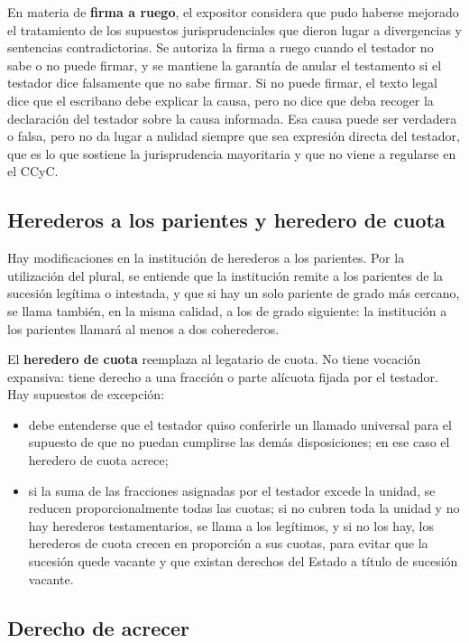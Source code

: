 \documentclass[12pt,oneside]{book}
\begin{document}
En materia de \textbf{firma a ruego}, el expositor considera que pudo haberse mejorado el tratamiento de los supuestos jurisprudenciales que dieron lugar a divergencias y sentencias contradictorias. Se autoriza la firma a ruego cuando el testador no sabe o no puede firmar, y se mantiene la garantía de anular el testamento si el testador dice falsamente que no sabe firmar. Si no puede firmar, el texto legal dice que el escribano debe explicar la causa, pero no dice que deba recoger la declaración del testador sobre la causa informada. Esa causa puede ser verdadera o falsa, pero no da lugar a nulidad siempre que sea expresión directa del testador, que es lo que sostiene la jurisprudencia mayoritaria y que no viene a regularse en el CCyC.

\subsection{Herederos a los parientes y heredero de cuota}

Hay modificaciones en la institución de herederos a los parientes. Por la utilización del plural, se entiende que la institución remite a los parientes de la sucesión legítima o intestada, y que si hay un solo pariente de grado más cercano, se llama también, en la misma calidad, a los de grado siguiente: la institución a los parientes llamará al menos a dos coherederos.

El \textbf{heredero de cuota} reemplaza al legatario de cuota. No tiene vocación expansiva: tiene derecho a una fracción o parte alícuota fijada por el testador. Hay supuestos de excepción:

\begin{itemize}
    \item debe entenderse que el testador quiso conferirle un llamado universal para el supuesto de que no puedan cumplirse las demás disposiciones; en ese caso el heredero de cuota acrece;
    \item si la suma de las fracciones asignadas por el testador excede la unidad, se reducen proporcionalmente todas las cuotas; si no cubren toda la unidad y no hay herederos testamentarios, se llama a los legítimos, y si no los hay, los herederos de cuota crecen en proporción a sus cuotas, para evitar que la sucesión quede vacante y que existan derechos del Estado a título de sucesión vacante.
\end{itemize}

\subsection{Derecho de acrecer}
\end{document}

